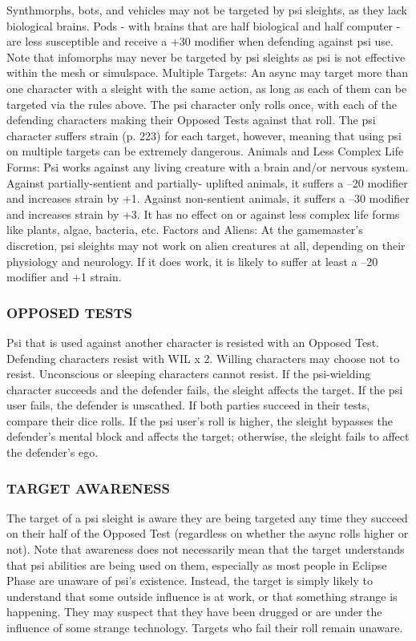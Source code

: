 Synthmorphs, bots, and vehicles may not be targeted by psi sleights, as they lack biological brains. Pods - with brains that are half biological and half computer - are less susceptible and receive a +30 modifier when defending against psi use. Note that infomorphs may never be targeted by psi sleights as psi is not effective within the mesh or simulspace. Multiple Targets: An async may target more than one character with a sleight with the same action, as long as each of them can be targeted via the rules above. The psi character only rolls once, with each of the defending characters making their Opposed Tests against that roll. The psi character suffers strain (p. 223) for each target, however, meaning that using psi on multiple targets can be extremely dangerous. Animals and Less Complex Life Forms: Psi works against any living creature with a brain and/or nervous system. Against partially-sentient and partially- uplifted animals, it suffers a –20 modifier and increases strain by +1. Against non-sentient animals, it suffers a –30 modifier and increases strain by +3. It has no effect on or against less complex life forms like plants, algae, bacteria, etc. Factors and Aliens: At the gamemaster’s discretion, psi sleights may not work on alien creatures at all, depending on their physiology and neurology. If it does work, it is likely to suffer at least a –20 modifier and +1 strain. 

\subsubsection{OPPOSED TESTS} 

Psi that is used against another character is resisted with an Opposed Test. Defending characters resist with WIL x 2. Willing characters may choose not to resist. Unconscious or sleeping characters cannot resist. If the psi-wielding character succeeds and the defender fails, the sleight affects the target. If the psi user fails, the defender is unscathed. If both parties succeed in their tests, compare their dice rolls. If the psi user’s roll is higher, the sleight bypasses the defender’s mental block and affects the target; otherwise, the sleight fails to affect the defender’s ego. 

\subsubsection{TARGET AWARENESS} 

The target of a psi sleight is aware they are being targeted any time they succeed on their half of the Opposed Test (regardless on whether the async rolls higher or not). Note that awareness does not necessarily mean that the target understands that psi abilities are being used on them, especially as most people in Eclipse Phase are unaware of psi’s existence. Instead, the target is simply likely to understand that some outside influence is at work, or that something strange is happening. They may suspect that they have been drugged or are under the influence of some strange technology. Targets who fail their roll remain unaware. 

